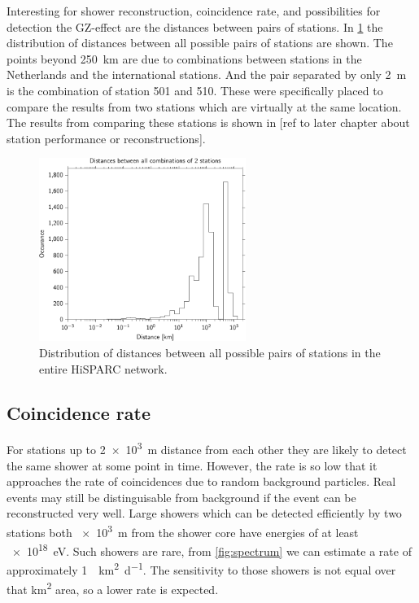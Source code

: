 Interesting for shower reconstruction, coincidence rate, and possibilities for detection the GZ-effect are the distances between pairs of stations. In \cref{fig:network_station_distances} the distribution of distances between all possible pairs of stations are shown. The points beyond \SI{250}{\kilo\meter} are due to combinations between stations in the Netherlands and the international stations. And the pair separated by only \SI{2}{\meter} is the combination of station 501 and 510. These were specifically placed to compare the results from two stations which are virtually at the same location. The results from comparing these stations is shown in [ref to later chapter about station performance or reconstructions].

\begin{figure}
    \centering
    \includegraphics[width=0.6\textwidth]
                    {plots/experiment/network_station_distances}
    \caption{Distribution of distances between all possible pairs of stations in the entire HiSPARC network.}
    \label{fig:network_station_distances}
\end{figure}

\subsection{Coincidence rate}

For stations up to \SI{2e3}{\meter} distance from each other they are likely to detect the same shower at some point in time. However, the rate is so low that it approaches the rate of coincidences due to random background particles. Real events may still be distinguisable from background if the event can be reconstructed very well. Large showers which can be detected efficiently by two stations both \SI{e3}{\meter} from the shower core have energies of at least \SI{e18}{\eV}. Such showers are rare, from \cref{fig:spectrum} we can estimate a rate of approximately \SI{1}{\per\kilo\meter\squared\per\day}. The sensitivity to those showers is not equal over that \si{\kilo\meter\squared} area, so a lower rate is expected.

